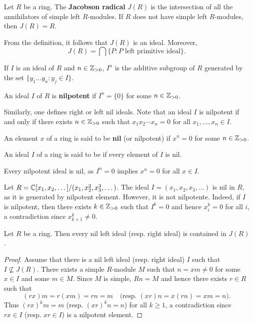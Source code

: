 \begin{definition}

Let $R$ be a ring. The \textbf{Jacobson radical} $J(R)$
is the intersection of all the annihilators of simple left $R$-modules. If $R$ does not
have simple left $R$-modules, then $J(R)=R$. 
\end{definition}

From the definition, it follows
that $J(R)$ is an ideal. Moreover, 
	\[
		J(R)=\bigcap\{P:\text{$P$ left primitive ideal}\}.
	\]

	If $I$ is an ideal of $R$ and $n\in\mathbb{Z}_{>0}$, $I^n$ is the additive subgroup of $R$ 
generated by the set $\{y_1\dots y_n:y_j\in I\}$. 

\begin{definition}
An ideal $I$ of $R$ is \textbf{nilpotent} 
if $I^n=\{0\}$ for some $n\in\mathbb{Z}_{>0}$.
\end{definition}

Similarly, one defines right or left nil ideals. 
Note that an ideal $I$ is nilpotent if and only if there exists $n\in\mathbb{Z}_{>0}$ such that 
$x_1x_2\cdots x_n=0$ for all $x_1,\dots,x_n\in I$.  

\begin{definition}
	An element $x$ of a ring is said to be \textbf{nil} (or nilpotent) if $x^n=0$ for some $n\in\mathbb{Z}_{>0}$. 
\end{definition}

\begin{definition}
An ideal $I$ of a ring is said to be  if every element of $I$ is nil. 
\end{definition}

Every nilpotent ideal is nil, as $I^n=0$ implies $x^n=0$ for all 
$x\in I$.

\begin{example}
	Let $R=\mathbb{C}[x_1,x_2,\dots]/(x_1,x_2^2,x_3^3,\dots)$. The ideal 
	$I=(x_1,x_2,x_3,\dots)$ is nil in $R$, as it is generated by nilpotent element. However, it is not nilpotente. Indeed, if $I$ is nilpotent, then there exists $k\in\mathbb{Z}_{>0}$ such that 
	$I^k=0$ and hence $x_i^k=0$ for all $i$, a contradiction since 
	$x_{k+1}^k\ne0$. 	
\end{example}

\begin{proposition}
	\label{pro:nilJ}
	Let $R$ be a ring. Then every nil left ideal (resp. right ideal) is contained in $J(R)$.
\end{proposition}

\begin{proof}
	Assume that there is a nil left ideal (resp. right ideal) $I$ such that 
	$I\not\subseteq J(R)$. There exists a simple $R$-module $M$ such that 
	$n=xm\ne 0$ for some $x\in I$ and some $m\in M$. Since $M$ is simple,
	$Rn=M$ and hence there exists $r\in R$ such that 
	\[
	(rx)m=r(xm)=rn=m\quad\text{(resp.
	$(xr)n=x(rn)=xm=n$).}
	\]
	Thus $(rx)^km=m$ (resp. $(xr)^kn=n$) for all 
	$k\geq1$, a contradiction since $rx\in I$ (resp. $xr\in I$) is a nilpotent element. 
\end{proof}

